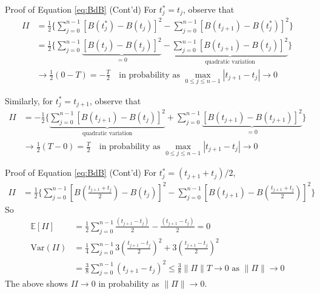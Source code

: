 \documentclass[letterpaper,handout]{beamer}
\def\Sum{\sum\nolimits}
\def\E{\mathbb E}
\def\V{\mathrm{Var}}
\begin{document}
\begin{frame}{Proof of Equation \eqref{eq:BdB} (Cont'd)}
For $t_j^*=t_j$, observe that
\begin{align*}
II&= \frac{1}{2}\Big\{
\Sum_{j=0}^{n-1}[B(t_j^*)-B(t_j)]^2-
\Sum_{j=0}^{n-1}[B(t_{j+1})-B(t_j^*)]^2\Big\}\\
&=\frac{1}{2}\Big\{
\Sum_{j=0}^{n-1}\underbrace{[B(t_j)-B(t_j)]^2}_{=0}-
\underbrace{\Sum_{j=0}^{n-1}[B(t_{j+1})-B(t_j)]^2}_{\text{quadratic variation}}\Big\}\\
&\to \frac{1}{2}(0-T)=-\frac{T}{2}\quad\text{in probability as }\max_{0\le j\le n-1}|t_{j+1}-t_j|\to 0
\end{align*}

Similarly, for $t_j^*=t_{j+1}$, observe that
\begin{align*}
II&= -\frac{1}{2}\Big\{
\underbrace{\Sum_{j=0}^{n-1}[B(t_{j+1})-B(t_j)]^2}_{\text{quadratic variation}}+
\Sum_{j=0}^{n-1}\underbrace{[B(t_{j+1})-B(t_{j+1})]^2}_{=0}\Big\}\\
&\to \frac{1}{2}(T-0)=\frac{T}{2}\quad\text{in probability as }\max_{0\le j\le n-1}|t_{j+1}-t_j|\to 0
\end{align*}
\end{frame}
\begin{frame}{Proof of Equation \eqref{eq:BdB} (Cont'd)}
For $t_j^*=(t_{j+1}+t_j)/2$,
\begin{align*}
II&= \frac{1}{2}\Big\{
\sum_{j=0}^{n-1}[B(\frac{t_{j+1}+t_j}{2})-B(t_j)]^2-
\sum_{j=0}^{n-1}[B(t_{j+1})-B(\frac{t_{j+1}+t_j}{2})]^2\Big\}
\end{align*}
So
\begin{align*}
\E[II]&=\frac{1}{2}\Sum_{j=0}^{n-1}\frac{(t_{j+1}-t_j)}{2}-\frac{(t_{j+1}-t_j)}{2}=0\\
\V(II)&=\frac{1}{4}\Sum_{j=0}^{n-1}3(\frac{t_{j+1}-t_j}{2})^2+3(\frac{t_{j+1}-t_j}{2})^2\\
&=\frac{3}{8}\Sum_{j=0}^{n-1}(t_{j+1}-t_j)^2\le \frac{3}{8}\|\Pi\|T\to 0\mbox{ as }\|\Pi\|\to 0
\end{align*}
The above shows $II\longrightarrow 0$ in probability as $\|\Pi\|\to 0$.
\end{frame}
\end{document}
